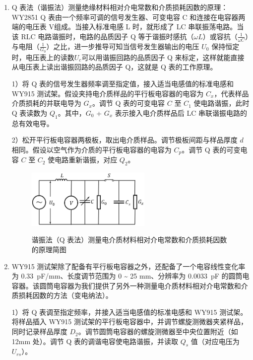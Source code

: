 \documentclass[a4paper,utf8]{article}
\begin{document}
        \begin{enumerate}
            \item Q 表法（谐振法）测量绝缘材料相对介电常数和介质损耗因数的原理：WY2851 Q 表由一个频率可调的信号发生器、可变电容 C 和连接在电容器两端的电压表 V组成。当接入标准电感 L 时，就形成了 LC 串联振荡电路。当该 RLC 电路谐振时，电路的品质因子 Q 等于谐振时感抗（$\omega L$）或容抗（$\frac{1}{\omega C}$）与电阻（$\frac{1}{G_0}$）之比，进一步推导可知当信号发生器输出的电压 $U_0$ 保持恒定时，电压表上的读数$U_c$可以用谐振回路的品质因子 Q 来标定，这样就能直接从电压表上读出谐振回路的品质因子 Q，这就是 Q 表的工作原理。\par
            
                1）将 Q 表的信号发生器频率调至指定值，接入适当电感值的标准电感和 WY915 测试架。假设夹持电介质样品的平行板电容器的电容为 $C_x$，代表样品介质损耗的并联电导为 $G_x$。调节 Q 表的可变电容 $C$ 至 $C_1$ 使电路谐振，此时 Q 表读数为 $Q_1$。其中，$G_0$ + $G_x$ 表示接入电介质样品后 LC 串联谐振电路的总有效电导。

                2）松开平行板电容器两极板，取出电介质样品。调节极板间距与样品厚度 $d$ 相同。假设以空气作为介质的平行板电容器的电容为 $C_p$。调节 Q 表的可变电容 $C$ 至 $C_2$ 使电路重新谐振，对应 $Q_2$。

                \begin{figure}[!ht]\centering
                    \includegraphics[width=60mm]{fg4.jpg}\
                    \caption{谐振法（Q 表法）测量电介质材料相对介电常数和介质损耗因数的原理简图\label{fig:4}}
                \end{figure}\par
            \item  WY915 测试架除了配备有平行板电容器之外，还配备了一个电容线性变化率为 \SI{0.33}{\pico\farad/\milli\metre}、长度调节范围为 0 \~{} 25 \unit{\milli\metre}、分辨率为 \SI{0.0033}{\pico\farad} 的圆筒电容器。该圆筒电容器为我们提供了另外一种测量电介质材料相对介电常数和介质损耗因数的方法（变电纳法）。
            
            1）将 Q 表调至指定频率，并接入适当电感值的标准电感和 WY915 测试架。将样品插入 WY915 测试架的平行板电容器中，并调节螺旋测微器夹紧样品，同时记录样品厚度 $D_2$。调节圆筒电容器的螺旋测微器至中央位置附近（如 12mm 处）。调节 Q 表的调谐电容使电路谐振，并读取 $Q_s$ 值（对应电压为 $U_{rs}$）。


\end{enumerate}
\end{document}
